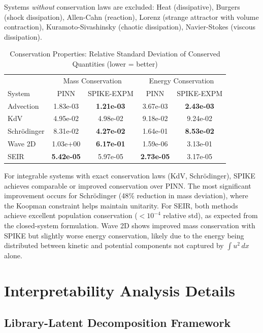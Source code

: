\documentclass{article}
\theoremstyle{remark}
\begin{document}
Systems \emph{without} conservation laws are excluded: Heat (dissipative), Burgers (shock dissipation), Allen-Cahn (reaction), Lorenz (strange attractor with volume contraction), Kuramoto-Sivashinsky (chaotic dissipation), Navier-Stokes (viscous dissipation).

\begin{table}[H]
\centering
\caption{Conservation Properties: Relative Standard Deviation of Conserved Quantities (lower = better)}
\label{tab:conservation}
\begin{tabular}{lcc|cc}
\toprule
& \multicolumn{2}{c|}{Mass Conservation} & \multicolumn{2}{c}{Energy Conservation} \\
System & PINN & SPIKE-EXPM & PINN & SPIKE-EXPM \\
\midrule
Advection & 1.83e-03 & \textbf{1.21e-03} & 3.67e-03 & \textbf{2.43e-03} \\
KdV & 4.95e-02 & 4.98e-02 & 9.18e-02 & 9.24e-02 \\
Schr\"odinger & 8.31e-02 & \textbf{4.27e-02} & 1.64e-01 & \textbf{8.53e-02} \\
Wave 2D & 1.03e+00 & \textbf{6.17e-01} & 1.59e-06 & 3.13e-01 \\
SEIR & \textbf{5.42e-05} & 5.97e-05 & \textbf{2.73e-05} & 3.17e-05 \\
\bottomrule
\end{tabular}
\end{table}

For integrable systems with exact conservation laws (KdV, Schr\"odinger), SPIKE achieves comparable or improved conservation over PINN. The most significant improvement occurs for Schr\"odinger (48\% reduction in mass deviation), where the Koopman constraint helps maintain unitarity. For SEIR, both methods achieve excellent population conservation ($<10^{-4}$ relative std), as expected from the closed-system formulation. Wave 2D shows improved mass conservation with SPIKE but slightly worse energy conservation, likely due to the energy being distributed between kinetic and potential components not captured by $\int u^2\,dx$ alone.

\FloatBarrier
\section{Interpretability Analysis Details}
\label{app:interpretability}

\subsection{Library-Latent Decomposition Framework}
\end{document}
